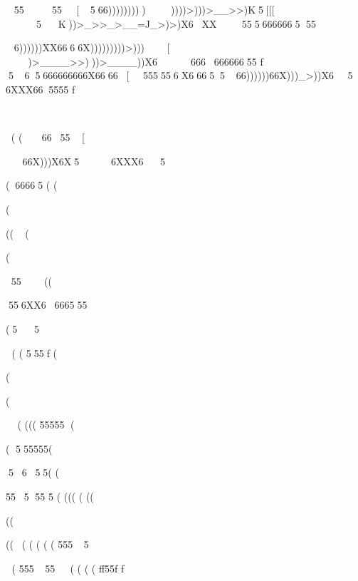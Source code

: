 5555
[566)))))))))))))>)))>__>>)K5[[[

5K))>_>>_>__=J_>)>)X6XX5556666665  55



6))))))XX6666X)))))))))>)))[

)>____>>)))>____))X666666666655     f


565666666666X6666[555556X6665566))))))66X)))_>))X656XXX665555             f











 (
(6655
[



66X)))X6X5

6XXX65 


(66665  (    
(

(



((     (







(
  


  
55
((



556XX6666555


(55




   (
(  555f   (






(


(







   (
(((
   55555  (


  (  555555(


5655(
   (



  555 55      5              (
(((
(
((





((



(((   ( (              ( (      5555 



( 55555 

( (
( 
(    ff55f       f    










